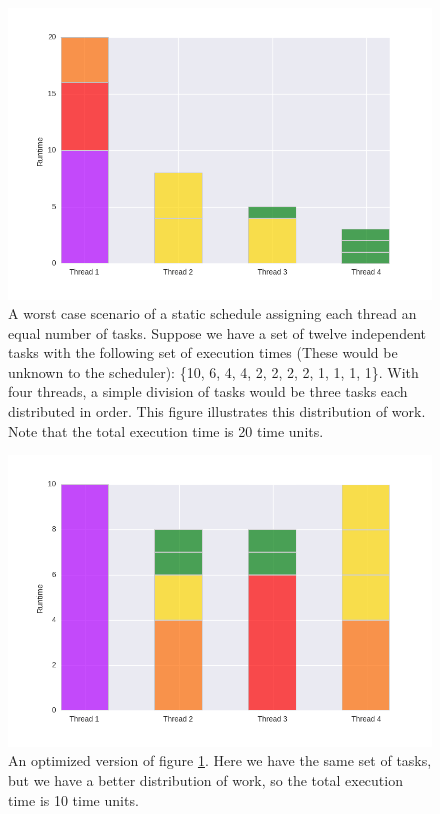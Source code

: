 \begin{figure}
	\centering
	\includegraphics[width=\textwidth]{graphics/unoptimized_schedule.png}
	\caption{A worst case scenario of a static schedule assigning each thread an equal number of tasks. Suppose we have a set of twelve independent tasks with the following set of execution times (These would be unknown to the scheduler): \{10, 6, 4, 4, 2, 2, 2, 2, 1, 1, 1, 1\}. With four threads, a simple division of tasks would be three tasks each distributed in order. This figure illustrates this distribution of work. Note that the total execution time is 20 time units.}
	\label{fig:unoptimized_schedule}
\end{figure}

\begin{figure}
	\centering
	\includegraphics[width=\textwidth]{graphics/optimized_schedule.png}
	\caption{An optimized version of figure \ref{fig:unoptimized_schedule}. Here we have the same set of tasks, but we have a better distribution of work, so the total execution time is 10 time units.}
	\label{fig:optimized_schedule}
\end{figure}



